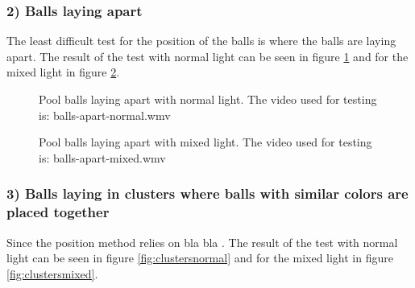 
\subsubsection{ 2) Balls laying apart}
The least difficult test for the position of the balls is where the balls are laying apart. The result of the test with normal light can be seen in figure \ref{fig:apartnormal} and for the mixed light in figure \ref{fig:apartmixed}.

\begin{figure}[H]
  \centering
   \caption{Pool balls laying apart with normal light. The video used for testing is: balls-apart-normal.wmv}
  \label{fig:apartnormal}
\end{figure}


\begin{figure}[H]
  \centering
   \caption{Pool balls laying apart with mixed light.  The video used for testing is: balls-apart-mixed.wmv}
  \label{fig:apartmixed}
\end{figure}


\subsubsection{ 3) Balls laying in clusters where balls with similar colors are placed together}
Since the position method relies on bla bla  . The result of the test with normal light can be seen in figure \ref{fig:clustersnormal} and for the mixed light in figure \ref{fig:clustersmixed}.

